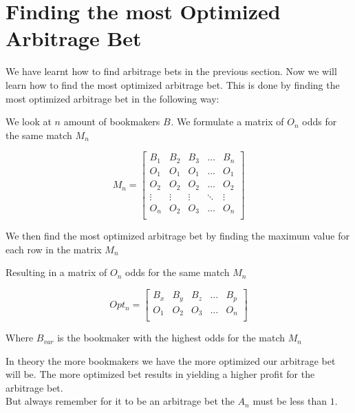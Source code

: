 \section{Finding the most Optimized Arbitrage Bet}

We have learnt how to find arbitrage bets in the previous section. Now we will learn how to find the most optimized arbitrage bet. This is done by finding the most optimized arbitrage bet in the following way:

We look at $n$ amount of bookmakers $B_{}$. We formulate a matrix of $O_{n}$ odds for the same match $M_{n}$

\begin{equation}
    M_{n} = \begin{bmatrix}
        B_{1} & B_{2} & B_{3} & \dots & B_{n} \\
        O_{1} & O_{1} & O_{1} & \dots & O_{1} \\
        O_{2} & O_{2} & O_{2} & \dots & O_{2} \\
        \vdots & \vdots & \vdots & \ddots & \vdots \\
        O_{n} & O_{2} & O_{3} & \dots & O_{n} \\
    \end{bmatrix}
\end{equation}

We then find the most optimized arbitrage bet by finding the maximum value for each row in the matrix $M_{n}$

Resulting in a matrix of $O_{n}$ odds for the same match $M_{n}$

\begin{equation}
    Opt_{n} = \begin{bmatrix}
        B_{x} & B_{y} & B_{z} & \dots & B_{p} \\
        O_{1} & O_{2} & O_{3} & \dots & O_{n} \\
    \end{bmatrix}
\end{equation}

Where $B_{var}$ is the bookmaker with the highest odds for the match $M_{n}$

In theory the more bookmakers we have the more optimized our arbitrage bet will be. The more optimized bet results in yielding a higher profit for the arbitrage bet.\\

But always remember for it to be an arbitrage bet the $A_{n}$ must be less than $1$.



